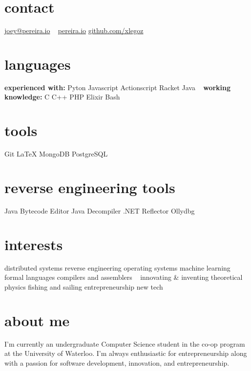 \documentclass[]{friggeri-cv-short}
\begin{document}

\begin{aside}
  \section{contact}
    \href{mailto:joey@pereira.io}{joey@pereira.io}
    ~
    \href{http://pereira.io}{pereira.io}
    \href{http://www.github.com/xlegoz}{github.com/xlegoz}
  \section{languages}
  \textbf{experienced with:}
    Pyton
    Javascript
  	Actionscript
  	Racket
  	Java
	~
	\textbf{working knowledge:}
  	C
	C++
  	PHP
    Elixir
	Bash
  \section{tools}
  	Git
  	\LaTeX
  	MongoDB
  	PostgreSQL
  \section{reverse engineering tools}
  	Java Bytecode Editor
  	Java Decompiler
  	.NET Reflector
  	Ollydbg
  \section{interests}
  	distributed systems
  	reverse engineering
  	operating systems
  	machine learning
  	formal languages
  	compilers and assemblers
  	~
	innovating \& inventing
  	theoretical physics
  	fishing and sailing
  	entrepreneurship
  	new tech
\end{aside}


 \section{about me}
 I'm currently an undergraduate Computer Science student in the co-op program at the University of Waterloo. I'm always enthusiastic for entrepreneurship along with a passion for software development, innovation, and entrepreneurship.

\end{document}
